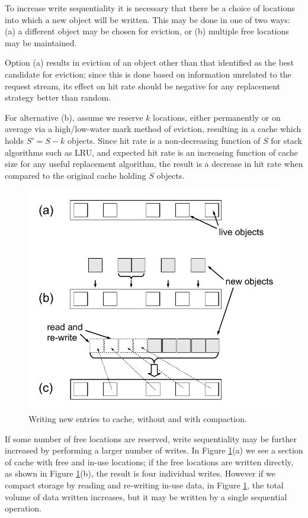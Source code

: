 \documentclass[letterpaper,twocolumn,10pt]{article}
\begin{document}
To increase write sequentiality it is necessary that
there be a choice of locations into which a new object will be
written. This may be done in one of two ways: (a) a different object
may be chosen for eviction, or (b) multiple free locations may be
maintained.

Option (a) results in eviction of an object other than that identified
as the best candidate for eviction; since this is done based on
information unrelated to the request stream, its effect on hit rate
should be negative for any replacement strategy better than random.

For alternative (b), assume we reserve $k$ locations, either
permanently or on average via a high/low-water mark method of
eviction, resulting in a cache which holds $S'=S-k$ objects. Since hit
rate is a non-decreasing function of $S$ for stack algorithms such as
LRU, and expected hit rate is an increasing function of cache size for
any useful replacement algorithm, the result is a decrease in hit rate
when compared to the original cache holding $S$ objects. 

\begin{figure}
\centering
\includegraphics[width=\columnwidth]{graphs/re-write}
\caption{Writing new entries to cache, without and with compaction.}
\label{fig:rewrite}
\end{figure}

If some number of free locations are reserved, write sequentiality may
be further increased by performing a larger number of writes. In
Figure \ref{fig:rewrite}(a) we see a section of cache with free and in-use
locations; if the free locations are written directly, as shown in
Figure \ref{fig:rewrite}(b), the result is four individual writes.
However if we compact storage by reading and re-writing in-use data,
in Figure \ref{fig:rewrite}, the total volume of data written increases, but
it may be written by a single sequential operation.
\end{document}

